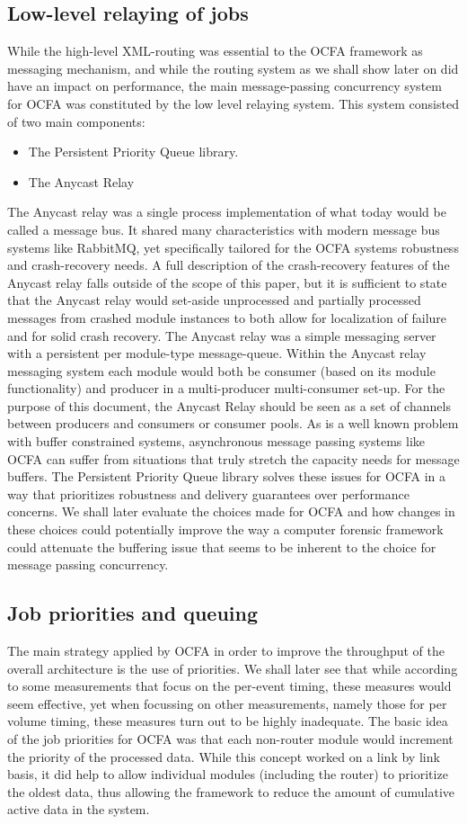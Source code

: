 \subsection{Low-level relaying of jobs}
While the high-level XML-routing was essential to the OCFA framework as messaging mechanism, and while the routing system as we shall show later on did have an impact on performance, the main message-passing concurrency system for OCFA was constituted by the low level relaying system. This system consisted of two main components:
\begin{itemize}
\item The Persistent Priority Queue library.
\item The Anycast Relay
\end{itemize}
The Anycast relay was a single process implementation of what today would be called a message bus. It shared many characteristics with modern message bus systems like RabbitMQ, yet specifically tailored for the OCFA systems robustness and crash-recovery needs. A full description of the crash-recovery features of the Anycast relay falls outside of the scope of this paper, but it is sufficient to state that the Anycast relay would set-aside unprocessed and partially processed messages from crashed module instances to both allow for localization of failure and for solid crash recovery. The Anycast relay was a simple messaging server with a persistent per module-type message-queue. Within the 
Anycast relay messaging system each module would both be consumer (based on its module functionality) and producer in a multi-producer multi-consumer set-up. 
For the purpose of this document, the Anycast Relay should be seen as a set of channels between producers and consumers or consumer pools. As is a well known problem with buffer constrained systems, asynchronous message passing systems like OCFA can suffer from situations that truly stretch the capacity needs for message buffers. The Persistent Priority Queue library solves these issues for OCFA in a way that prioritizes robustness and delivery guarantees over performance concerns. We shall later evaluate the choices made for OCFA and how changes in these choices could potentially improve the way a computer forensic framework could attenuate the buffering issue that seems to be inherent to the choice for message passing concurrency. 
\subsection{Job priorities and queuing}
The main strategy applied by OCFA in order to improve the throughput of the overall architecture is the use of priorities. We shall later see that while according to some measurements that focus on the per-event timing, these measures would seem effective, yet when focussing on other measurements, namely those for per volume timing, these measures turn out to be highly inadequate. The basic idea of the job priorities for OCFA was that each non-router module would increment the priority of the processed data. While this concept worked on a link by link basis, it did help to allow individual modules (including the router) to prioritize the oldest data, thus allowing the framework to reduce the amount of cumulative active data in the system. 
